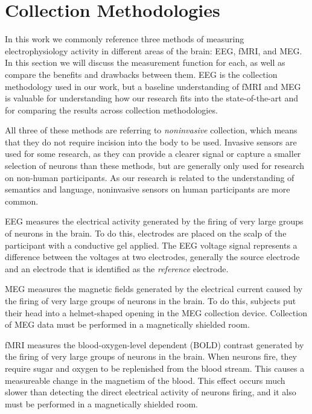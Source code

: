 \section{Collection Methodologies}
\label{chapter:introduction:sec:collection}

In this work we commonly reference three methods of measuring electrophysiology 
activity in different areas of the brain: EEG, fMRI, and MEG. In this section 
we will discuss the measurement function for each, as well as compare the 
benefits and drawbacks between them. EEG is the collection methodology used in 
our work, but a baseline understanding of fMRI and MEG is valuable for 
understanding how our research fits into the state-of-the-art and for comparing 
the results across collection methodologies.

All three of these methods are referring to \emph{noninvasive} collection, 
which means that they do not require incision into the body to be used.  
Invasive sensors are used for some research, as they can provide a clearer 
signal or capture a smaller selection of neurons than these methods, but are 
generally only used for research on non-human participants. As our research is 
related to the understanding of semantics and language, noninvasive sensors on 
human participants are more common.

EEG measures the electrical activity generated by the firing of very large 
groups of neurons in the brain. To do this, electrodes are placed on the scalp 
of the participant with a conductive gel applied. The EEG voltage signal 
represents a difference between the voltages at two electrodes, generally the 
source electrode and an electrode that is identified as the \emph{reference} 
electrode.

MEG measures the magnetic fields generated by the electrical current caused by 
the firing of very large groups of neurons in the brain. To do this, subjects 
put their head into a helmet-shaped opening in the MEG collection device. 
Collection of MEG data must be performed in a magnetically shielded room.

fMRI measures the blood-oxygen-level dependent (BOLD) contrast generated by the 
firing of very large groups of neurons in the brain. When neurons fire, they 
require sugar and oxygen to be replenished from the blood stream. This causes a 
measureable change in the magnetism of the blood. This effect occurs much 
slower than detecting the direct electrical activity of neurons firing, and it 
also must be performed in a magnetically shielded room.


